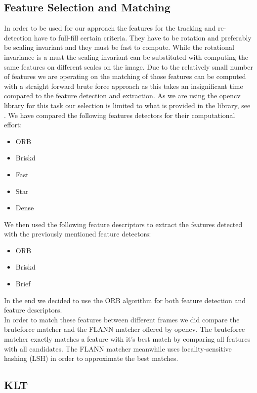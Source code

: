 \documentclass[10pt,conference,compsocconf]{IEEEtran}
\begin{document}
\subsection{Feature Selection and Matching}
In order to be used for our approach the features for the tracking and re-detection have to full-fill certain criteria. They have to be rotation and preferably be scaling invariant and they must be fast to compute. While the rotational invariance is a must the scaling invariant can be substituted with computing the same features on different scales on the image. Due to the relatively small number of features we are operating on the matching of those features can be computed with a straight forward brute force approach as this takes an insignificant time compared to the feature detection and extraction. As we are using the opencv library for this task our selection is limited to what is provided in the library, see \cite{web:ocvfeature}. We have compared the following features detectors for their computational effort:

\begin{itemize}
\item ORB 
\item Briskd
\item Fast
\item Star
\item Dense
\end{itemize}

We then used the following feature descriptors to extract the features detected with the previously mentioned feature detectors:

\begin{itemize}
\item ORB
\item Briskd
\item Brief
\end{itemize}

In the end we decided to use the ORB algorithm for both feature detection and feature descriptors.\\
In order to match these features between different frames we did compare the bruteforce matcher and the FLANN matcher offered by opencv. The bruteforce matcher exactly matches a feature with it's best match by comparing all features with all candidates. The FLANN matcher meanwhile uses locality-sensitive hashing (LSH) in order to approximate the best matches.


\subsection{KLT}
\end{document}
